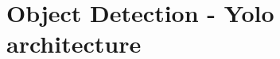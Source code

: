 \documentclass{standalone}
\begin{document}
\section[Yolo]{Object Detection - Yolo architecture}\label{yolo}

\end{document}
